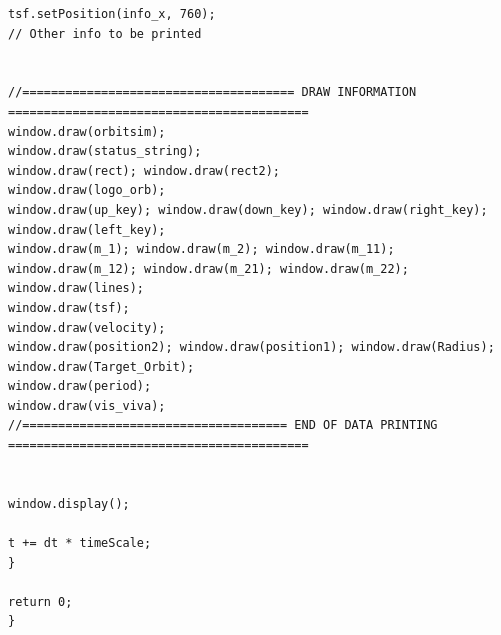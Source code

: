 \documentclass[12pt, letter]{article}
\begin{document}
\begin{verbatim}
tsf.setPosition(info_x, 760);
// Other info to be printed


//====================================== DRAW INFORMATION ==========================================
window.draw(orbitsim);
window.draw(status_string);
window.draw(rect); window.draw(rect2);
window.draw(logo_orb);
window.draw(up_key); window.draw(down_key); window.draw(right_key); window.draw(left_key);
window.draw(m_1); window.draw(m_2); window.draw(m_11); window.draw(m_12); window.draw(m_21); window.draw(m_22);
window.draw(lines);
window.draw(tsf);
window.draw(velocity);
window.draw(position2); window.draw(position1); window.draw(Radius); window.draw(Target_Orbit);
window.draw(period);
window.draw(vis_viva);
//===================================== END OF DATA PRINTING ==========================================


window.display();

t += dt * timeScale;
}

return 0;
}
\end{verbatim}
\end{document}
